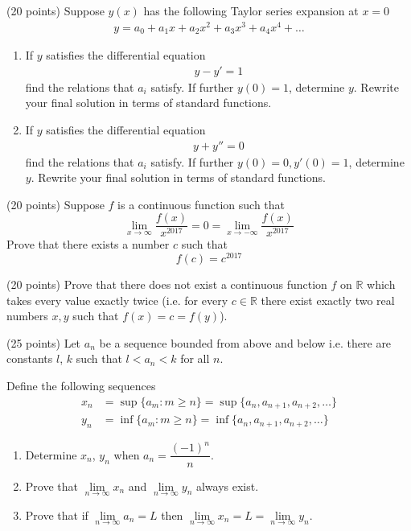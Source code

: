 \documentclass[9pt, a4paper, oneside, reqno]{amsart}
\begin{document}
\begin{questions}
	\item (20 points) Suppose $ y(x)$ has the following Taylor series expansion at $ x= 0 $
	\begin{align*}
		y = a_0 + a_1 x+ a_2 x^2 + a_3 x^3 + a_4 x^4 + \dots
	\end{align*}
	\begin{enumerate}
		\item If $ y$ satisfies the differential equation
		      \begin{align*}
			      y - y' = 1
		      \end{align*}
		      find the relations that $ a_i$ satisfy. If further $ y(0) = 1$, determine $ y$. Rewrite your final solution in terms of standard functions.
		\item If $ y$ satisfies the differential equation
		      \begin{align*}
			      y + y'' = 0
		      \end{align*}
		      find the relations that $ a_i$ satisfy. If further $ y(0) = 0, y'(0) = 1$, determine $ y$. Rewrite your final solution in terms of standard functions.
	\end{enumerate}

	\item (20 points) Suppose $ f$ is a continuous function such that $$ \lim \limits_{x \rightarrow \infty} \dfrac{f(x)}{x^{2017}} = 0 = \lim \limits_{x \rightarrow -\infty} \dfrac{f(x)}{x^{2017}} $$ Prove that there exists a number $ c$ such that $$ f(c) = c^{2017}$$

	\item (20 points) Prove that there does not exist a continuous function $ f$ on $ \mathbb{R}$ which takes every value exactly twice (i.e. for every $ c \in \mathbb{R}$ there exist exactly two real numbers $ x,y$ such that $ f(x) = c = f(y)$).

	\item (25 points) Let $ a_n $ be a sequence bounded from above and below i.e. there are constants $ l$, $k$ such that $l < a_n < k$ for all $ n$.

	Define the following sequences
	\begin{align*}
		x_n & = \sup \{ a_m : m \ge n\} = \sup \{ a_n, a_{n + 1}, a_{n + 2}, \dots \} \\
		y_n & = \inf \{ a_m : m \ge n\} = \inf \{ a_n, a_{n + 1}, a_{n + 2}, \dots \}
	\end{align*}
	\begin{enumerate}
		\item Determine $ x_n$, $ y_n$ when $ a_n = \dfrac{(-1)^n}{n}$.
		\item Prove that $ \lim \limits_{n \rightarrow \infty} x_n$ and $ \lim \limits_{n \rightarrow \infty} y_n$ always exist.
		\item Prove that if $ \lim \limits_{n \rightarrow \infty} a_n = L$ then $ \lim \limits_{n \rightarrow \infty} x_n = L = \lim \limits_{n \rightarrow \infty} y_n$.
	\end{enumerate}
\end{questions}
\end{document}
